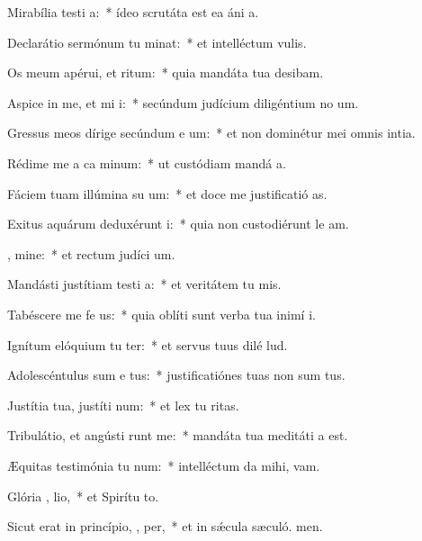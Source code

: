 \item Mirabília testi a:~* ídeo scrutáta est ea áni a.
\item Declarátio sermónum tu minat:~* et intelléctum  vulis.
\item Os meum apérui, et  ritum:~* quia mandáta tua desibam.
\item Aspice in me, et mi i:~* secúndum judícium diligéntium no um.
\item Gressus meos dírige secúndum e um:~* et non dominétur mei omnis intia.
\item Rédime me a ca minum:~* ut custódiam mandá a.
\item Fáciem tuam illúmina su  um:~* et doce me justificatió as.
\item Exitus aquárum deduxérunt  i:~* quia non custodiérunt le am.
\item {} , mine:~* et rectum judíci um.
\item Mandásti justítiam testi a:~* et veritátem tu mis.
\item Tabéscere me fe  us:~* quia oblíti sunt verba tua inimí i.
\item Ignítum elóquium tu ter:~* et servus tuus dilé lud.
\item Adolescéntulus sum e  tus:~* justificatiónes tuas non sum tus.
\item Justítia tua, justíti  num:~* et lex tu ritas.
\item Tribulátio, et angústi runt me:~* mandáta tua meditáti a est.
\item Æquitas testimónia tu  num:~* intelléctum da mihi,  vam.
\item Glória ,  lio,~* et Spirítu to.
\item Sicut erat in princípio,  ,  per,~* et in sǽcula sæculó. men.
